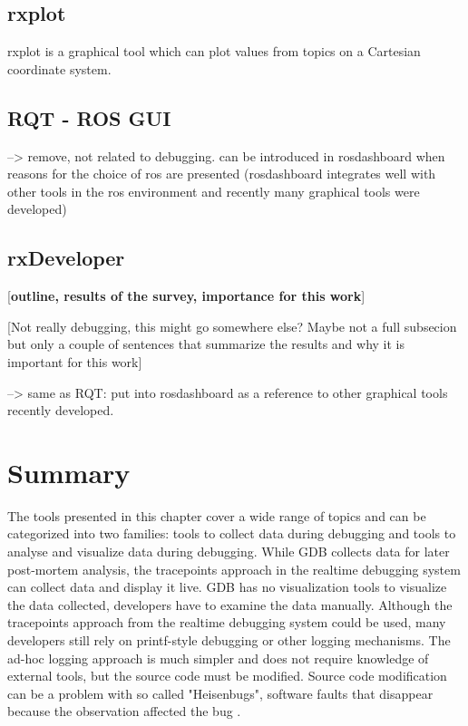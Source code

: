 
\subsection{rxplot}
rxplot is a graphical tool which can plot values from topics on a Cartesian coordinate system. 

\subsection{RQT - ROS GUI}
--> remove, not related to debugging. can be introduced in rosdashboard when reasons for the choice of ros are presented (rosdashboard integrates well with other tools in the ros environment and recently many graphical tools were developed)
\subsection{rxDeveloper}
[\textbf{outline, results of the survey, importance for this work}]
\cite{Muellers2012}

[Not really debugging, this might go somewhere else? Maybe not a full subsecion but only a couple of sentences that summarize the results and why it is important for this work]

--> same as RQT: put into rosdashboard as a reference to other graphical tools recently developed.

\section{Summary}

The tools presented in this chapter cover a wide range of topics and can be categorized into two families: tools to collect data during debugging and tools to analyse and visualize data during debugging. While GDB collects data for later post-mortem analysis, the tracepoints approach in the realtime debugging system can collect data and display it live. GDB has no visualization tools to visualize the data collected, developers have to examine the data manually. Although the tracepoints approach from the realtime debugging system \cite{Gumbley2009} could be used, many developers still rely on printf-style debugging or other logging mechanisms. The ad-hoc logging approach is much simpler and does not require knowledge of external tools, but the source code must be modified. Source code modification can be a problem with so called "Heisenbugs", software faults that disappear because the observation affected the bug \cite{Grottke2005}.

